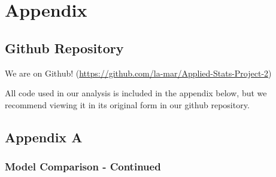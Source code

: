 \chapter{Appendix}\label{chap:appendix}

\section{Github Repository}\label{github}

We are on Github! (\url{https://github.com/la-mar/Applied-Stats-Project-2})

All code used in our analysis is included in the appendix below, but we recommend viewing it in its original form in our github repository.

\section{Appendix A}\label{appendix-a}



\subsection{Model Comparison - Continued}\label{moremodelcomp}

\begin{figure}[!hb]
\end{figure}


